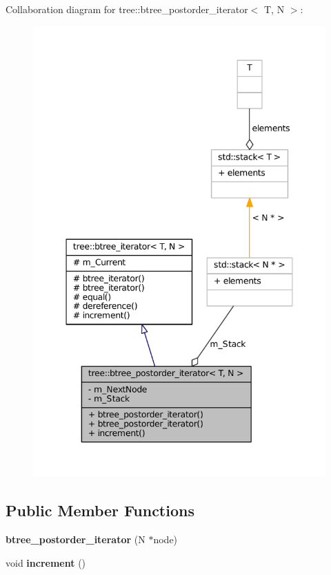 \-Collaboration diagram for tree\-:\-:btree\-\_\-postorder\-\_\-iterator$<$ \-T, \-N $>$\-:
\nopagebreak
\begin{figure}[H]
\begin{center}
\leavevmode
\includegraphics[width=347pt]{classtree_1_1btree__postorder__iterator__coll__graph}
\end{center}
\end{figure}
\subsection*{\-Public \-Member \-Functions}
\begin{DoxyCompactItemize}
\item 
\hypertarget{classtree_1_1btree__postorder__iterator_a9dec1c88cc657e81f3579058beda85b1}{{\bfseries btree\-\_\-postorder\-\_\-iterator} (\-N $\ast$node)}\label{classtree_1_1btree__postorder__iterator_a9dec1c88cc657e81f3579058beda85b1}

\item 
\hypertarget{classtree_1_1btree__postorder__iterator_ab4fb98322432ec53accacd76d17d520e}{void {\bfseries increment} ()}\label{classtree_1_1btree__postorder__iterator_ab4fb98322432ec53accacd76d17d520e}

\end{DoxyCompactItemize}
